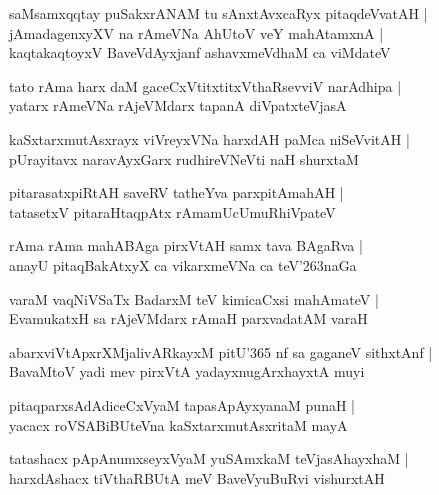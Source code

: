 \documentclass[twoside,12pt,openright]{book}
\def\S{\char'263}
\newcounter{shloka}[chapter]
\begin{document}
\begin{shloka}
saMsamxqqtay puSakxrANAM  tu sAnxtAvxcaRyx pitaqdeVvatAH |\\
jAmadagenxyXV na rAmeVNa AhUtoV veY mahAtamxnA |\\
kaqtakaqtoyxV BaveVdAyxjanf ashavxmeVdhaM ca viMdateV 
\end{shloka}

\begin{shloka}
tato rAma harx daM gaceCxVtitxtitxVthaRsevviV narAdhipa |\\
yatarx rAmeVNa rAjeVMdarx tapanA diVpatxteVjasA
\end{shloka}

\begin{shloka}
kaSxtarxmutAsxrayx viVreyxVNa harxdAH paMca niSeVvitAH |\\
pUrayitavx naravAyxGarx rudhireVNeVti naH shurxtaM 
\end{shloka}

\begin{shloka}
pitarasatxpiRtAH saveRV tatheYva parxpitAmahAH |\\
tatasetxV pitaraHtaqpAtx rAmamUcUmuRhiVpateV 
\end{shloka}

\begin{shloka}
rAma rAma mahABAga pirxVtAH samx tava BAgaRva |\\
anayU pitaqBakAtxyX ca vikarxmeVNa ca teV\S naGa
\end{shloka}

\begin{shloka}
varaM vaqNiVSaTx BadarxM teV kimicaCxsi mahAmateV |\\
EvamukatxH  sa rAjeVMdarx rAmaH parxvadatAM varaH 
\end{shloka}

\begin{shloka}
abarxviVtApxrXMjalivARkayxM pitU\char'365 nf sa gaganeV sithxtAnf |\\
BavaMtoV yadi mev pirxVtA yadayxnugArxhayxtA muyi
\end{shloka}

\begin{shloka}
pitaqparxsAdAdiceCxVyaM tapasApAyxyanaM punaH |\\
yacacx roVSABiBUteVna kaSxtarxmutAsxritaM mayA 
\end{shloka}

\begin{shloka}
tatashacx pApAnumxseyxVyaM yuSAmxkaM teVjasAhayxhaM |\\
harxdAshacx tiVthaRBUtA meV BaveVyuBuRvi vishurxtAH 
\end{shloka}
\end{document}
